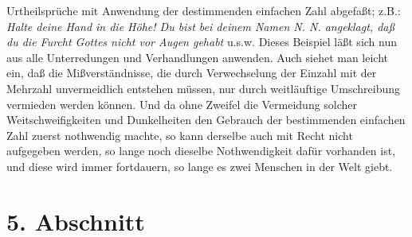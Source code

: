 Urtheilsprüche mit Anwendung der destimmenden einfachen Zahl abgefaßt; z.B.:
\textit{Halte deine Hand in die Höhe! Du bist bei deinem Namen N. N. angeklagt,
daß du
die Furcht Gottes nicht vor Augen gehabt} u.s.w. Dieses Beispiel läßt sich nun
aus alle Unterredungen und Verhandlungen anwenden. Auch siehet man leicht ein,
daß die Mißverständnisse, die durch Verwechselung der Einzahl mit der Mehrzahl
unvermeidlich entstehen müssen, nur durch weitläuftige Umschreibung vermieden
werden können. Und da ohne Zweifel die Vermeidung solcher Weitschweifigkeiten
und Dunkelheiten den Gebrauch der bestimmenden einfachen Zahl zuerst nothwendig
machte, so kann derselbe auch mit Recht nicht aufgegeben werden, so lange noch
dieselbe Nothwendigkeit dafür vorhanden ist, und diese wird immer fortdauern, so
lange es zwei Menschen in der Welt giebt.

\section{5. Abschnitt} \label{kap10_ab5}

